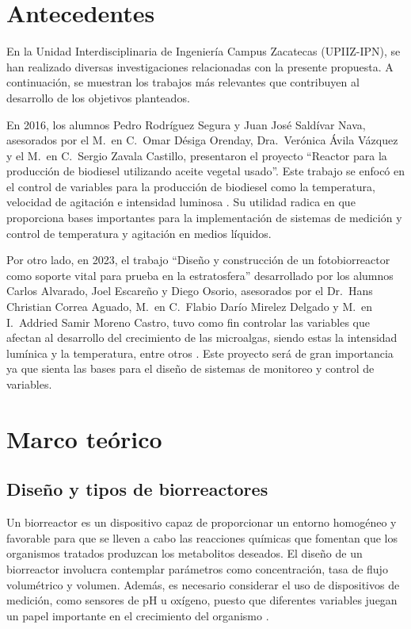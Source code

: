 \documentclass[11pt,tesis,twoside,openright,spanish]{upiiztt}
\begin{document}
\chapter{Antecedentes}\label{cap3}

En la Unidad Interdisciplinaria de Ingeniería Campus Zacatecas (UPIIZ-IPN), se
han realizado diversas investigaciones relacionadas con la presente propuesta. A
continuación, se muestran los trabajos más relevantes que contribuyen al desarrollo
de los objetivos planteados.

En 2016, los alumnos Pedro Rodríguez Segura y Juan José Saldívar Nava,
asesorados por el M.\ en C.\ Omar Désiga Orenday, Dra.\ Verónica Ávila Vázquez y
el M.\ en C.\ Sergio Zavala Castillo, presentaron el proyecto ``Reactor para la
producción de biodiesel utilizando aceite vegetal usado''. Este trabajo se enfocó en
el control de variables para la producción de biodiesel como la temperatura,
velocidad de agitación e intensidad luminosa \cite{Rodriguez2016}. Su utilidad radica en que
proporciona bases importantes para la implementación de sistemas de medición y
control de temperatura y agitación en medios líquidos.

Por otro lado, en 2023, el trabajo ``Diseño y construcción de un fotobiorreactor como
soporte vital para prueba en la estratosfera'' desarrollado por los alumnos Carlos
Alvarado, Joel Escareño y Diego Osorio, asesorados por el Dr.\ Hans Christian
Correa Aguado, M.\ en C.\ Flabio Darío Mirelez Delgado y M.\ en I.\ Addried Samir
Moreno Castro, tuvo como fin controlar las variables que afectan al desarrollo del
crecimiento de las microalgas, siendo estas la intensidad lumínica y la temperatura,
entre otros \cite{Alvarado2023}. Este proyecto será de gran importancia ya que sienta las bases para
el diseño de sistemas de monitoreo y control de variables.

\chapter{Marco teórico}\label{cap4}

\section{Diseño y tipos de biorreactores}

Un biorreactor es un dispositivo capaz de proporcionar un entorno homogéneo y
favorable para que se lleven a cabo las reacciones químicas que fomentan que los
organismos tratados produzcan los metabolitos deseados. El diseño de un
biorreactor involucra contemplar parámetros como concentración, tasa de flujo
volumétrico y volumen. Además, es necesario considerar el uso de dispositivos de
medición, como sensores de pH u oxígeno, puesto que diferentes variables juegan
un papel importante en el crecimiento del organismo \cite{Jaibiba2020}.
\end{document}

